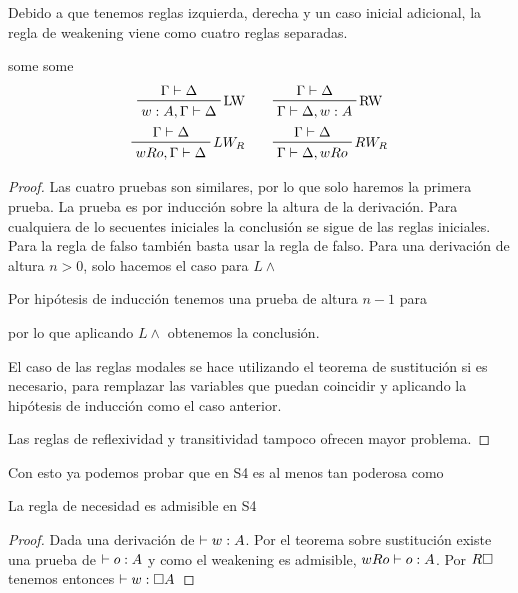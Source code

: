 Debido a que tenemos reglas izquierda, derecha y un caso inicial adicional, la regla de weakening viene como cuatro reglas separadas.

\begin{teo}
  some
  some
  \begin{align*}
    \tree{LW}{\Gamma \derives \Delta}{w:A, \Gamma \derives \Delta} \qquad & \tree{RW}{\Gamma \derives \Delta}{\Gamma \derives \Delta, w:A} \\ 
    \tree{$LW_R$}{\Gamma \derives \Delta}{wRo, \Gamma \derives \Delta} \qquad & \tree{$RW_R$}{\Gamma \derives \Delta}{\Gamma \derives \Delta, wRo} 
  \end{align*}
\end{teo}

\begin{proof}
  Las cuatro pruebas son similares, por lo que solo haremos la primera prueba.
  La prueba es por inducción sobre la altura de la derivación.
  Para cualquiera de lo secuentes iniciales la conclusión se sigue de las reglas iniciales. Para la regla de falso también basta usar la regla de falso. 
  Para una derivación de altura $n>0$, solo hacemos el caso para $L \land$


  Por hipótesis de inducción tenemos una prueba de altura $n-1$ para


  por lo que aplicando $L \land$ obtenemos la conclusión.

  El caso de las reglas modales se hace utilizando el teorema de sustitución si es necesario, para remplazar las variables que puedan coincidir y aplicando la hipótesis de inducción como el caso anterior.

  Las reglas de reflexividad y transitividad tampoco ofrecen mayor problema.
\end{proof}

Con esto ya podemos probar que en S4 es al menos tan poderosa como \K

\begin{teo}
  La regla de necesidad es admisible en S4
\end{teo}

\begin{proof}
  Dada una derivación de $\vdash w:A$. Por el teorema sobre sustitución existe una prueba de $\vdash o:A$ y como el weakening es admisible, $wRo \vdash o:A$. Por $R\square$ tenemos entonces $\vdash w:\square A$ 
\end{proof}
